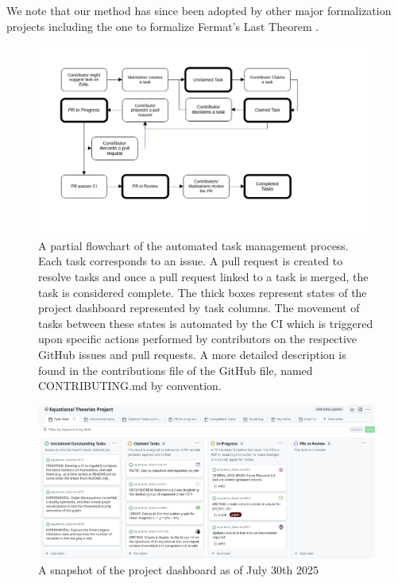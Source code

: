 We note that our method has since been adopted by other major formalization projects including the one to formalize Fermat's Last Theorem \cite{FLT_Lean}.
\begin{figure}[t]
    \centering
    \includegraphics[width=1.0\textwidth]{proj_mgmt_figures/task_flowchart.png}
    \caption{\label{fig:proj_mgmt_flow} A partial flowchart of the automated task management process. Each task corresponds to an issue. A pull request is created to resolve tasks and once a pull request linked to a task is merged, the task is considered complete. The thick boxes represent states of the project dashboard represented by task columns. The movement of tasks between these states is automated by the CI which is triggered upon specific actions performed by contributors on the respective GitHub issues and pull requests. A more detailed description is found in the contributions file of the GitHub file, named CONTRIBUTING.md by convention.}
\end{figure}

\begin{figure}[t]
    \centering
    \includegraphics[width=1.0\textwidth]{proj_mgmt_figures/proj_dash_snapshot.png}
    \caption{\label{fig:proj_dashboard} A snapshot of the project dashboard as of July 30th 2025}
\end{figure}
